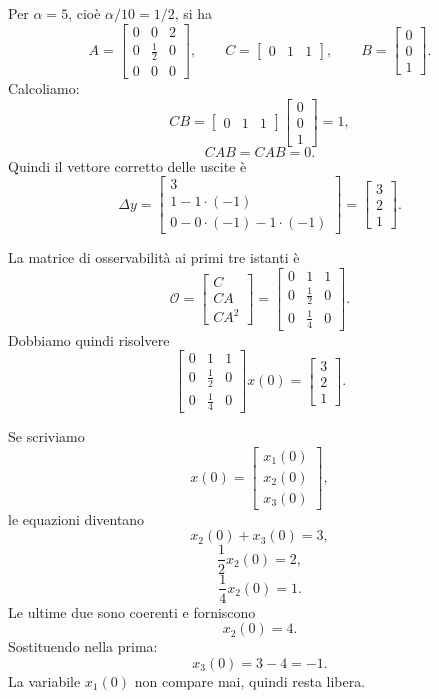 Per \(\alpha=5\), cioè \(\alpha/10=1/2\), si ha
\[
A=
\begin{bmatrix}
0 & 0 & 2\\
0 & \frac12 & 0\\
0 & 0 & 0
\end{bmatrix},
\qquad
C=
\begin{bmatrix}
0 & 1 & 1
\end{bmatrix},
\qquad
B=
\begin{bmatrix}
0\\0\\1
\end{bmatrix}.
\]
Calcoliamo:
\[
CB=
\begin{bmatrix}
0 & 1 & 1
\end{bmatrix}
\begin{bmatrix}
0\\0\\1
\end{bmatrix}=1,
\]
\[
CAB=CAB=0.
\]
Quindi il vettore corretto delle uscite è
\[
\Delta y=
\begin{bmatrix}
3\\
1-1\cdot(-1)\\
0-0\cdot(-1)-1\cdot(-1)
\end{bmatrix}
=
\begin{bmatrix}
3\\2\\1
\end{bmatrix}.
\]

La matrice di osservabilità ai primi tre istanti è
\[
\mathcal O=
\begin{bmatrix}
C\\CA\\CA^2
\end{bmatrix}
=
\begin{bmatrix}
0 & 1 & 1\\
0 & \frac12 & 0\\
0 & \frac14 & 0
\end{bmatrix}.
\]
Dobbiamo quindi risolvere
\[
\begin{bmatrix}
0 & 1 & 1\\
0 & \frac12 & 0\\
0 & \frac14 & 0
\end{bmatrix}
x(0)=
\begin{bmatrix}
3\\2\\1
\end{bmatrix}.
\]

Se scriviamo
\[
x(0)=
\begin{bmatrix}
x_1(0)\\x_2(0)\\x_3(0)
\end{bmatrix},
\]
le equazioni diventano
\[
x_2(0)+x_3(0)=3,
\]
\[
\frac12 x_2(0)=2,
\]
\[
\frac14 x_2(0)=1.
\]
Le ultime due sono coerenti e forniscono
\[
x_2(0)=4.
\]
Sostituendo nella prima:
\[
x_3(0)=3-4=-1.
\]
La variabile \(x_1(0)\) non compare mai, quindi resta libera.


